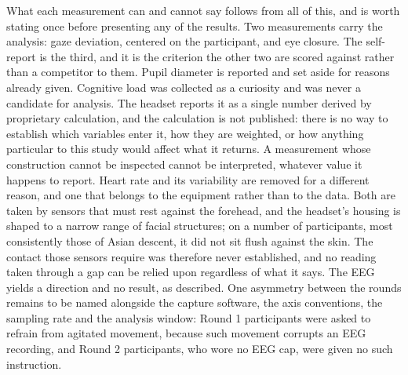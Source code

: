 What each measurement can and cannot say follows from all of this, and is worth stating once
before presenting any of the results. Two measurements carry the analysis: gaze deviation, centered on the
participant, and eye closure. The self-report is the third, and it is the criterion the other
two are scored against rather than a competitor to them. Pupil diameter is reported and set
aside for reasons already given. Cognitive load was collected as a curiosity and was never a
candidate for analysis. The headset reports it as a single number derived by proprietary
calculation, and the calculation is not published: there is no way to establish which
variables enter it, how they are weighted, or how anything particular to this study would
affect what it returns. A measurement whose construction cannot be inspected cannot be
interpreted, whatever value it happens to report. Heart rate and its variability are removed for a different reason, and one that
belongs to the equipment rather than to the data. Both are taken by sensors that must rest
against the forehead, and the headset's housing is shaped to a narrow range of facial
structures; on a number of participants, most consistently those of Asian descent, it did not
sit flush against the skin. The contact those sensors require was therefore never established,
and no reading taken through a gap can be relied upon regardless of what it says. The EEG yields a direction and no result, as described. One asymmetry
between the rounds remains to be named alongside the capture software, the axis conventions,
the sampling rate and the analysis window: Round 1 participants were asked to refrain from
agitated movement, because such movement corrupts an EEG recording, and Round 2 participants,
who wore no EEG cap, were given no such instruction.
